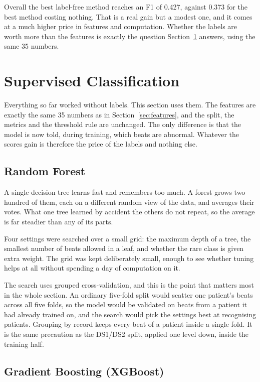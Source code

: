 \documentclass[a4paper, 12pt]{article}
\begin{document}
Overall the best label-free method reaches an F1 of \num{0.427}, against
\num{0.373} for the best method costing nothing. That is a real gain but a modest
one, and it comes at a much higher price in features and computation. Whether the
labels are worth more than the features is exactly the question
Section~\ref{sec:supervised} answers, using the same 35 numbers.



\section{Supervised Classification} \label{sec:supervised}

Everything so far worked without labels. This section uses them. The features are
exactly the same 35 numbers as in Section~\ref{sec:features}, and the split, the
metrics and the threshold rule are unchanged. The only difference is that the
model is now told, during training, which beats are abnormal. Whatever the scores
gain is therefore the price of the labels and nothing else.

\subsection{Random Forest} \label{subsec:rf}

A single decision tree learns fast and remembers too much. A forest grows two
hundred of them, each on a different random view of the data, and averages their
votes. What one tree learned by accident the others do not repeat, so the average
is far steadier than any of its parts.

Four settings were searched over a small grid: the maximum depth of a tree,
the smallest number of beats allowed in a leaf, and whether the rare class is
given extra weight. The grid was kept deliberately small, enough to see whether
tuning helps at all without spending a day of computation on it.

The search uses grouped cross-validation, and this is the point that matters most
in the whole section. An ordinary five-fold split would scatter one patient's
beats across all five folds, so the model would be validated on beats from a
patient it had already trained on, and the search would pick the settings best at
recognising patients. Grouping by record keeps every beat of a patient inside a
single fold. It is the same precaution as the DS1/DS2 split, applied one level
down, inside the training half.

\subsection{Gradient Boosting (XGBoost)} \label{subsec:xgb}
\end{document}
